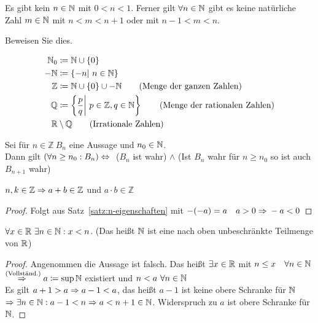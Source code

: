 \begin{korollar}
    \label{korollar:4.2.7}
    Es gibt kein $n\in\mathbb{N}$ mit $0<n<1$. Ferner gilt $\forall n\in\mathbb{N}$ gibt es keine natürliche Zahl $m\in\mathbb{N}$ mit $n<m<n+1$ oder mit $n-1<m<n$.
\end{korollar}
\begin{uebung}
    Beweisen Sie dies.
\end{uebung}
\begin{notation}[Zahlenmengen]
    \begin{align*}
        \mathbb{N}_0 &\coloneqq \mathbb{N}\cup\left\{0\right\}\\
        \mathbb{-N} &\coloneqq \left\{-n|~n\in\mathbb{N}\right\}\\
        \mathbb{Z} &\coloneqq \mathbb{N}\cup\left\{0\right\}\cup\mathbb{-N} \tag{Menge der ganzen Zahlen}\\
        \mathbb{Q} &\coloneqq\left\{\frac{p}{q}\middle|~p\in\mathbb{Z}, q\in\mathbb{N}\right\} \tag{Menge der rationalen Zahlen}\\
        \mathbb{R}&\setminus\mathbb{Q}\tag{Irrationale Zahlen}
    \end{align*}
\end{notation}
\begin{bemerkung}
    Sei für $n\in\mathbb{Z}~B_n$ eine Aussage und $n_0\in\mathbb{N}$.\\
    Dann gilt $\left(\forall n\geq n_0: B_n\right) \Leftrightarrow{}$ ($B_n$ ist wahr) $\land$ (Ist $B_n$ wahr für $n\geq n_0$ so ist auch $B_{n+1}$ wahr)
\end{bemerkung}

\begin{satz}
    $n,k\in\mathbb{Z} \Rightarrow{} a +b \in\mathbb{Z}$ und $a\cdot b \in\mathbb{Z}$
    \begin{proof}
        Folgt aus Satz~\ref{satz:n-eigenschaften} mit $-(-a) = a\quad a > 0 \Rightarrow{} -a < 0$
    \end{proof}
\end{satz}

\begin{satz}
    \label{satz:von-archimedes}
    $\forall x\in\mathbb{R}~\exists n\in\mathbb{N}: x < n$.
    (Das heißt $\mathbb{N}$ ist eine nach oben unbeschränkte Teilmenge von $\mathbb{R}$)
    \begin{proof}
        Angenommen die Aussage ist falsch. Das heißt $\exists x\in\mathbb{R}$ mit $n\leq x\quad\forall n\in\mathbb{N}$\\
        $\overset{\text{(Vollständ.)}}{\Rightarrow{}} a\coloneqq \sup\mathbb{N}$ existiert und $n<a~\forall n\in\mathbb{N}$\\
        Es gilt $a+1 > a \Rightarrow{} a - 1 < a$, das heißt $a-1$ ist keine obere Schranke für $\mathbb{N}$\\
        $\Rightarrow{} \exists n\in\mathbb{N}: a-1<n \Rightarrow{} a < n + 1 \in\mathbb{N}$. Widerspruch zu $a$ ist obere Schranke für $\mathbb{N}$.
    \end{proof}
\end{satz}

